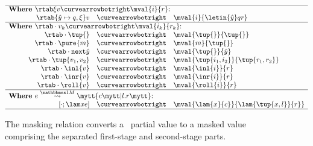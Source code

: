 
\begin{figure}
\begin{abstrsyn}
\[\begin{array}{rrrl}
\hline
\multicolumn{4}{l}  {\text{\bf Where } \rtab \xi v \vsplito \mval {i} {r} \text{:}}          \\
\hspace{0.25in} 
&\rtab {\hat y \mapsto q,\xi} v  &\vsplito& \mval  {i}             {\letin {\hat y} q {r}}      \\
\hline
\multicolumn{4}{l}  {\text{\bf Where } \rtab \cdot {v_k} \vsplito \mval {i_k} {r_k} \text{:}}  \\
&\rtab \cdot {\tup{}}            &\vsplito& \mval  {\tup{}}        {\tup{}}                     \\
&\rtab \cdot {\pure{m}}          &\vsplito& \mval  {m}             {\tup{}}                     \\
&\rtab \cdot {\next{\hat y}}     &\vsplito& \mval  {\tup{}}            {\hat y}                     \\
&\rtab \cdot {\tup{v_1,v_2}}         &\vsplito& \mval  {\tup{i_1,i_2}}     {\tup{r_1,r_2}}                  \\
&\rtab \cdot {\inl{v}}           &\vsplito& \mval  {\inl{i}}       {r}                          \\
&\rtab \cdot {\inr{v}}           &\vsplito& \mval  {\inr{i}}       {r}                          \\
&\rtab \cdot {\roll{v}}          &\vsplito& \mval  {\roll{i}}      {r}                          \\
\hline
\multicolumn{4}{l}  {\text{\bf Where } \splitone e A {c}{l.r} \text{:}}                   \\
&[\cdot;\lam xe]           &\vsplito& \mval  {\lam {x} {c}}  {\lam {\tup{x,l}} {r}}			\\
\hline
\end{array}\]
\end{abstrsyn}
\caption{The masking relation converts a \lang\ partial value to a masked value
comprising the separated first-stage and second-stage parts.}
\label{fig:valMask}
\end{figure}
